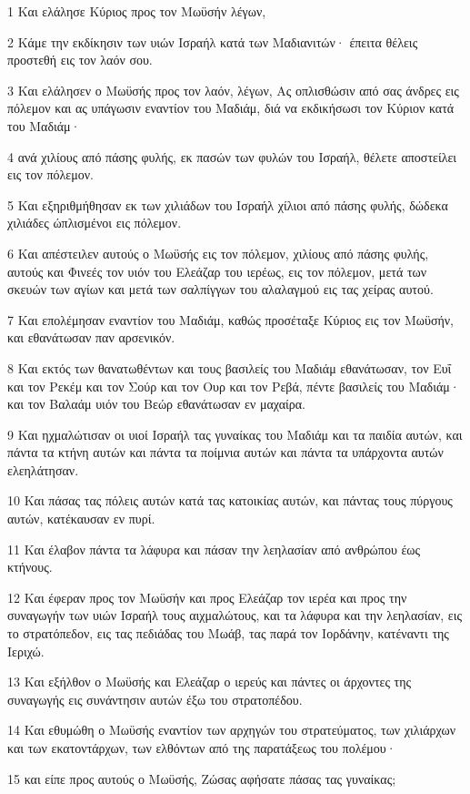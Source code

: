 \par 1 Και ελάλησε Κύριος προς τον Μωϋσήν λέγων,
\par 2 Κάμε την εκδίκησιν των υιών Ισραήλ κατά των Μαδιανιτών· έπειτα θέλεις προστεθή εις τον λαόν σου.
\par 3 Και ελάλησεν ο Μωϋσής προς τον λαόν, λέγων, Ας οπλισθώσιν από σας άνδρες εις πόλεμον και ας υπάγωσιν εναντίον του Μαδιάμ, διά να εκδικήσωσι τον Κύριον κατά του Μαδιάμ·
\par 4 ανά χιλίους από πάσης φυλής, εκ πασών των φυλών του Ισραήλ, θέλετε αποστείλει εις τον πόλεμον.
\par 5 Και εξηριθμήθησαν εκ των χιλιάδων του Ισραήλ χίλιοι από πάσης φυλής, δώδεκα χιλιάδες ώπλισμένοι εις πόλεμον.
\par 6 Και απέστειλεν αυτούς ο Μωϋσής εις τον πόλεμον, χιλίους από πάσης φυλής, αυτούς και Φινεές τον υιόν του Ελεάζαρ του ιερέως, εις τον πόλεμον, μετά των σκευών των αγίων και μετά των σαλπίγγων του αλαλαγμού εις τας χείρας αυτού.
\par 7 Και επολέμησαν εναντίον του Μαδιάμ, καθώς προσέταξε Κύριος εις τον Μωϋσήν, και εθανάτωσαν παν αρσενικόν.
\par 8 Και εκτός των θανατωθέντων και τους βασιλείς του Μαδιάμ εθανάτωσαν, τον Ευΐ και τον Ρεκέμ και τον Σούρ και τον Ουρ και τον Ρεβά, πέντε βασιλείς του Μαδιάμ· και τον Βαλαάμ υιόν του Βεώρ εθανάτωσαν εν μαχαίρα.
\par 9 Και ηχμαλώτισαν οι υιοί Ισραήλ τας γυναίκας του Μαδιάμ και τα παιδία αυτών, και πάντα τα κτήνη αυτών και πάντα τα ποίμνια αυτών και πάντα τα υπάρχοντα αυτών ελεηλάτησαν.
\par 10 Και πάσας τας πόλεις αυτών κατά τας κατοικίας αυτών, και πάντας τους πύργους αυτών, κατέκαυσαν εν πυρί.
\par 11 Και έλαβον πάντα τα λάφυρα και πάσαν την λεηλασίαν από ανθρώπου έως κτήνους.
\par 12 Και έφεραν προς τον Μωϋσήν και προς Ελεάζαρ τον ιερέα και προς την συναγωγήν των υιών Ισραήλ τους αιχμαλώτους, και τα λάφυρα και την λεηλασίαν, εις το στρατόπεδον, εις τας πεδιάδας του Μωάβ, τας παρά τον Ιορδάνην, κατέναντι της Ιεριχώ.
\par 13 Και εξήλθον ο Μωϋσής και Ελεάζαρ ο ιερεύς και πάντες οι άρχοντες της συναγωγής εις συνάντησιν αυτών έξω του στρατοπέδου.
\par 14 Και εθυμώθη ο Μωϋσής εναντίον των αρχηγών του στρατεύματος, των χιλιάρχων και των εκατοντάρχων, των ελθόντων από της παρατάξεως του πολέμου·
\par 15 και είπε προς αυτούς ο Μωϋσής, Ζώσας αφήσατε πάσας τας γυναίκας;
